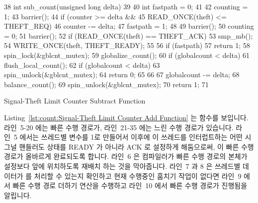 \begin{listing}[tb]
{ \scriptsize
\begin{verbbox}
 38 int sub_count(unsigned long delta)
 39 {
 40   int fastpath = 0;
 41 
 42   counting = 1;
 43   barrier();
 44   if (counter >= delta &&
 45       READ_ONCE(theft) <= THEFT_REQ) {
 46     counter -= delta;
 47     fastpath = 1;
 48   }
 49   barrier();
 50   counting = 0;
 51   barrier();
 52   if (READ_ONCE(theft) == THEFT_ACK) {
 53     smp_mb();
 54     WRITE_ONCE(theft, THEFT_READY);
 55   }
 56   if (fastpath)
 57     return 1;
 58   spin_lock(&gblcnt_mutex);
 59   globalize_count();
 60   if (globalcount < delta) {
 61     flush_local_count();
 62     if (globalcount < delta) {
 63       spin_unlock(&gblcnt_mutex);
 64       return 0;
 65     }
 66   }
 67   globalcount -= delta;
 68   balance_count();
 69   spin_unlock(&gblcnt_mutex);
 70   return 1;
 71 }
\end{verbbox}
}
\centering
\theverbbox
\caption{Signal-Theft Limit Counter Subtract Function}
\label{lst:count:Signal-Theft Limit Counter Subtract Function}
\end{listing}

Listing~\ref{lst:count:Signal-Theft Limit Counter Add Function} 는
 함수를 보입니다.
라인~5-20 에는 빠른 수행 경로가, 라인~21-35 에는 느린 수행 경로가 있습니다.
라인~5 에서는 쓰레드별  변수를 1로 만들어서 이후에 이 쓰레드를
인터럽트하는 어떤 시그널 핸들러도  상태를 READY 가 아니라 ACK 로
설정하게 해둠으로써, 이 빠른 수행 경로가 올바르게 완료되도록 합니다.
라인~6 은 컴파일러가 빠른 수행 경로의 본체가  설정보다 앞에
위치하도록 재배치 하는 것을 막아줍니다.
라인~7 과 8 은 쓰레드별 데이터가  를 처리할 수 있는지 확인하고
현재 수행중인 훔치기 작업이 없다면 라인~9 에서 빠른 수행 경로 더하기 연산을
수행하고 라인~10 에서 빠른 수행 경로가 진행됨을 알립니다.

